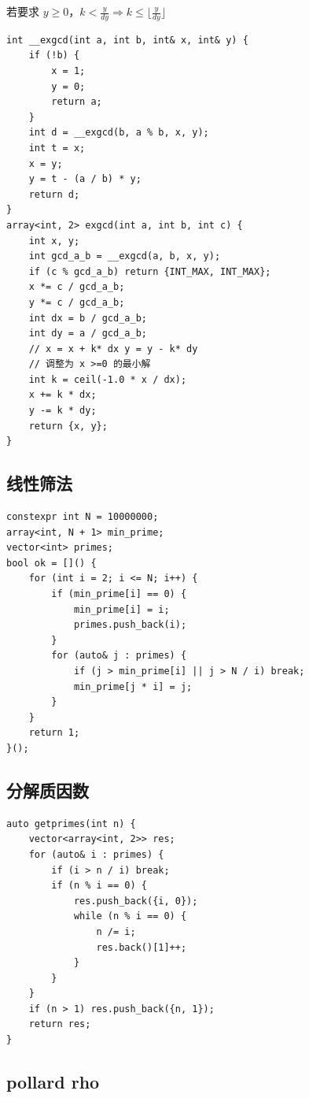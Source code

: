 \documentclass[UTF8]{ctexart}
\begin{document}
\begin{sloppypar}
若要求 $y\ge0$，$k<\frac{y}{dy}\Rightarrow k\le\lfloor \frac{y}{dy}\rfloor$


\begin{lstlisting}[style=cpp]
int __exgcd(int a, int b, int& x, int& y) {
    if (!b) {
        x = 1;
        y = 0;
        return a;
    }
    int d = __exgcd(b, a % b, x, y);
    int t = x;
    x = y;
    y = t - (a / b) * y;
    return d;
}
array<int, 2> exgcd(int a, int b, int c) {
    int x, y;
    int gcd_a_b = __exgcd(a, b, x, y);
    if (c % gcd_a_b) return {INT_MAX, INT_MAX};
    x *= c / gcd_a_b;
    y *= c / gcd_a_b;
    int dx = b / gcd_a_b;
    int dy = a / gcd_a_b;
    // x = x + k* dx y = y - k* dy
    // 调整为 x >=0 的最小解
    int k = ceil(-1.0 * x / dx);
    x += k * dx;
    y -= k * dy;
    return {x, y};
}
\end{lstlisting}

\subsection{线性筛法}

\begin{lstlisting}[style=cpp]
constexpr int N = 10000000;
array<int, N + 1> min_prime;
vector<int> primes;
bool ok = []() {
    for (int i = 2; i <= N; i++) {
        if (min_prime[i] == 0) {
            min_prime[i] = i;
            primes.push_back(i);
        }
        for (auto& j : primes) {
            if (j > min_prime[i] || j > N / i) break;
            min_prime[j * i] = j;
        }
    }
    return 1;
}();
\end{lstlisting}

\subsection{分解质因数}

\begin{lstlisting}[style=cpp]
auto getprimes(int n) {
    vector<array<int, 2>> res;
    for (auto& i : primes) {
        if (i > n / i) break;
        if (n % i == 0) {
            res.push_back({i, 0});
            while (n % i == 0) {
                n /= i;
                res.back()[1]++;
            }
        }
    }
    if (n > 1) res.push_back({n, 1});
    return res;
}
\end{lstlisting}

\subsection{pollard rho}


\end{sloppypar}
\end{document}

